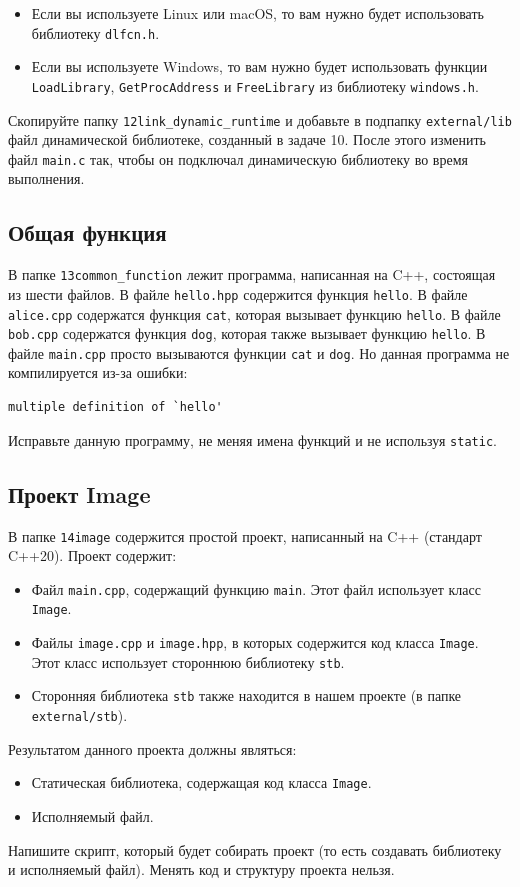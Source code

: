 \documentclass{article}
\begin{document}
\begin{itemize}
\item Если вы используете Linux или macOS, то вам нужно будет использовать библиотеку \texttt{dlfcn.h}.
\item Если вы используете Windows, то вам нужно будет использовать функции \texttt{LoadLibrary}, \texttt{GetProcAddress} и \texttt{FreeLibrary} из библиотеку \texttt{windows.h}.
\end{itemize}
Скопируйте папку \texttt{12link\_dynamic\_runtime} и добавьте в подпапку \texttt{external/lib} файл динамической библиотеке, созданный в задаче 10. После этого изменить файл \texttt{main.c} так, чтобы он подключал динамическую библиотеку во время выполнения.


\subsection{Общая функция}
В папке \texttt{13common\_function} лежит программа, написанная на C++, состоящая из шести файлов. В файле \texttt{hello.hpp} содержится функция \texttt{hello}. В файле \texttt{alice.cpp} содержатся функция \texttt{cat}, которая вызывает функцию \texttt{hello}. В файле \texttt{bob.cpp} содержатся функция \texttt{dog}, которая также вызывает функцию \texttt{hello}. В файле \texttt{main.cpp} просто вызываются функции \texttt{cat} и \texttt{dog}. Но данная программа не компилируется из-за ошибки:
\begin{lstlisting}[style=csMiptBash]
multiple definition of `hello'
\end{lstlisting}
Исправьте данную программу, не меняя имена функций и не используя \texttt{static}.



\subsection{Проект Image}
В папке \texttt{14image} содержится простой проект, написанный на C++ (стандарт C++20).
Проект содержит:
\begin{itemize}
\item Файл \texttt{main.cpp}, содержащий функцию \texttt{main}. Этот файл использует класс \texttt{Image}.
\item Файлы \texttt{image.cpp} и \texttt{image.hpp}, в которых содержится код класса \texttt{Image}.\\
Этот класс использует стороннюю библиотеку \texttt{stb}.
\item Сторонняя библиотека \texttt{stb} также находится в нашем проекте (в папке \texttt{external/stb}).
\end{itemize}
Результатом данного проекта должны являться:
\begin{itemize}
\item Статическая библиотека, содержащая код класса \texttt{Image}.
\item Исполняемый файл.
\end{itemize}
Напишите скрипт, который будет собирать проект (то есть создавать библиотеку и исполняемый файл). Менять код и структуру проекта нельзя.
\end{document}
